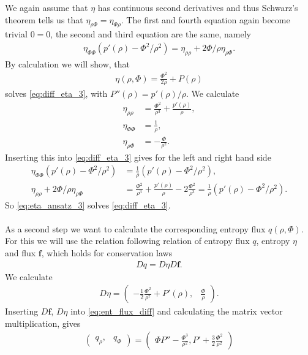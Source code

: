 We again assume that $\eta$ has continuous second derivatives and thus Schwarz's theorem tells us that $\eta_{\rho\Phi}=\eta_{\Phi\rho}$. The first and fourth equation again become trivial $0=0$, the second and third equation are the same, namely
\begin{align}
\eta_{\Phi\Phi}(p'(\rho)-\Phi^2/\rho^2) = \eta_{\rho\rho} +2\Phi/\rho \eta_{\rho \Phi}.\label{eq:diff_eta_3}
\end{align}
By calculation we will show, that 
\begin{align}
\eta(\rho,\Phi)= \frac {\Phi^2}{2\rho} +P(\rho) \label{eq:eta_ansatz_3}
\end{align}
solves \cref{eq:diff_eta_3}, with $P''(\rho)=p'(\rho)/\rho$. We calculate
\begin{align}
\eta_{\rho\rho}&=\frac{\Phi^2}{\rho^3}+\frac{p'(\rho)}{\rho},\\
\eta_{\Phi\Phi}&=\frac 1\rho,\\
\eta_{\rho\Phi}&=-\frac{\Phi}{\rho^2}.
\end{align}
Inserting this into \cref{eq:diff_eta_3} gives for the left and right hand side
\begin{align}
\eta_{\Phi\Phi}(p'(\rho)-\Phi^2/\rho^2)&=\frac 1\rho(p'(\rho)-\Phi^2/\rho^2),\\
 \eta_{\rho\rho} +2\Phi/\rho \eta_{\rho \Phi}& = \frac{\Phi^2}{\rho^3}+\frac{p'(\rho)}{\rho} -2\frac{\Phi^2}{\rho^3} = \frac 1\rho(p'(\rho)-\Phi^2/\rho^2).
\end{align}
So \cref{eq:eta_ansatz_3} solves \cref{eq:diff_eta_3}. \\ \\
As a second step we want to calculate the corresponding entropy flux $ q(\rho,\Phi)$.
For this we will use the relation following relation of entropy flux $q$, entropy $\eta$ and flux $\bm f$, which holds for conservation laws
\begin{align}
D q = D\eta D\bm f.\label{eq:ent_flux_diff}
\end{align}
We calculate
\begin{align}
D\eta = \begin{pmatrix}
-\frac 12 \frac{\Phi^2}{\rho^2} +P'(\rho), &
\frac{\Phi}{\rho}
\end{pmatrix}.
\end{align}
Inserting $D\bm f$, $D\eta$ into \cref{eq:ent_flux_diff} and calculating the matrix vector multiplication, gives
\begin{align}
\begin{pmatrix}
q_\rho ,& q_\Phi 
\end{pmatrix}
=\begin{pmatrix}
\Phi P'' -\frac{\Phi^3}{\rho^2}, P' +\frac 32 \frac{\Phi^2}{\rho^2}
\end{pmatrix}\label{eq:der_q}
\end{align}
